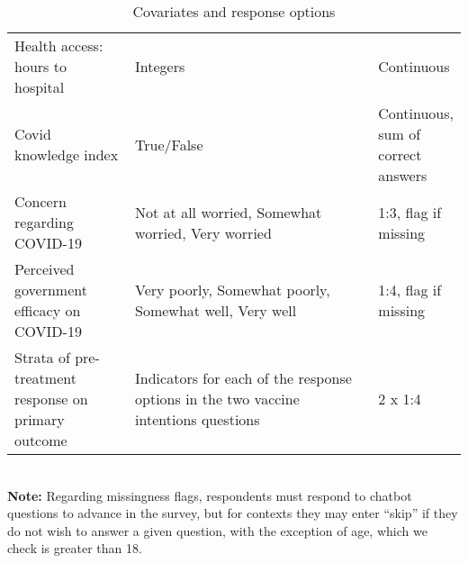\begin{table}[H]
\begin{adjustbox}{totalheight=.9\baselineskip, max width = \textwidth}
\begin{tabular}{p{0.3\linewidth}p{0.7\linewidth}p{0.25\linewidth}}
Health access: hours to hospital                    & Integers                                                                                                                                                                                                                            & Continuous                                                                                     \\
Covid knowledge index                               & True/False                                                                                                                                                                                                                          & Continuous, sum of correct answers                                                             \\
Concern regarding COVID-19                          & Not at all worried, Somewhat worried, Very worried                                                                                                                                                                                  & 1:3, flag if missing                                                                           \\
Perceived government efficacy on COVID-19           & Very poorly, Somewhat poorly, Somewhat well, Very well                                                                                                                                                                              & 1:4, flag if missing                                                                           \\
Strata of pre-treatment response on primary outcome & Indicators for each of the response options in the two vaccine intentions questions                                                                                                                                                 & 2 x 1:4            
\end{tabular} 
\end{adjustbox}
\footnotesize
\ \ \\
\textbf{Note:} Regarding missingness flags, respondents must respond to chatbot questions to advance in the survey, but for contexts they may enter ``skip'' if they do not wish to answer a given question, with the exception of age, which we check is greater than 18. 
\caption{Covariates and response options}
\label{cov_long}
\end{table}